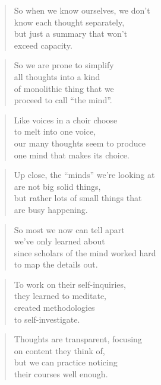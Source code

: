 \documentclass[14pt,a4paper]{article}
\begin{document}
\begin{verse}
So when we know ourselves, we don’t\\
know each thought separately,\\
but just a summary that won’t\\
exceed capacity.
\end{verse}

\begin{verse}
So we are prone to simplify\\
all thoughts into a kind\\
of monolithic thing that we\\
proceed to call “the mind”.
\end{verse}

\begin{verse}
Like voices in a choir choose\\
to melt into one voice,\\
our many thoughts seem to produce\\
one mind that makes its choice.
\end{verse}

\begin{verse}
Up close, the “minds” we’re looking at\\
are not big solid things,\\
but rather lots of small things that\\
are busy happening.
\end{verse}

\begin{verse}
So most we now can tell apart\\
we’ve only learned about\\
since scholars of the mind worked hard\\
to map the details out.
\end{verse}

\begin{verse}
To work on their self-inquiries,\\
they learned to meditate,\\
created methodologies\\
to self-investigate.
\end{verse}

\begin{verse}
Thoughts are transparent, focusing\\
on content they think of,\\
but we can practice noticing\\
their courses well enough.
\end{verse}
\end{document}
